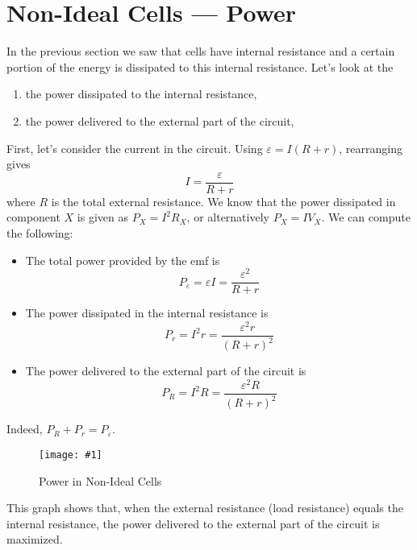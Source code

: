 \documentclass[a4paper,12pt]{article}
\let\oldsection\section
\renewcommand\section{\clearpage\oldsection}
\newcommand{\img}[4]{\begin{center}
  \begin{figure}[H]
    \centering
    \texttt{[image: \#1]}
    \caption{#3}
    \label{fig:#4}
  \end{figure}
\end{center}}
\begin{document}
\section{Non-Ideal Cells --- Power}

In the previous section we saw that cells have internal resistance and a certain portion of the energy is dissipated to this internal resistance. Let's look at the
\begin{enumerate}
  \item the power dissipated to the internal resistance,
  \item the power delivered to the external part of the circuit,
\end{enumerate}
First, let's consider the current in the circuit. Using $\varepsilon = I(R + r)$, rearranging gives
\begin{equation}
  I = \frac{\varepsilon}{R + r}
\end{equation}
where $R$ is the total external resistance.
We know that the power dissipated in component $X$ is given as $P_X = I^2R_X$,
or alternatively $P_X = IV_X$.
We can compute the following:
\begin{itemize}
  \item The total power provided by the emf is $$P_{\varepsilon} = \varepsilon I = \frac{\varepsilon^2}{R + r}$$
  \item The power dissipated in the internal resistance is $$P_r = I^2r = \frac{\varepsilon^2r}{(R + r)^2}$$
  \item The power delivered to the external part of the circuit is $$P_{R} = I^2R = \frac{\varepsilon^2R}{(R + r)^2}$$
\end{itemize}
Indeed, $P_R + P_r = P_{\varepsilon}$.

\pagebreak

\img{peakre.png}{0.7}{Power in Non-Ideal Cells}{power}

This graph shows that, when the external resistance (load resistance) equals the internal resistance, the power delivered to the external part of the circuit is maximized.
\end{document}
